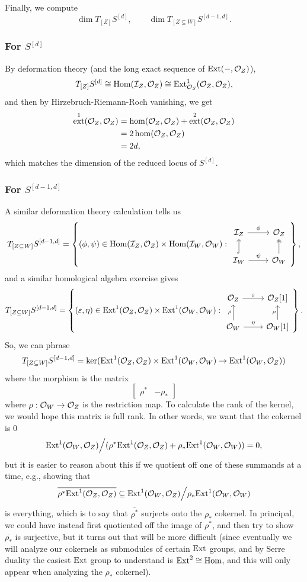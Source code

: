 \documentclass[12pt]{article}
\DeclareMathOperator{\ext}{ext}
\begin{document}
Finally, we compute
\[\dim T_{[Z]} S^{[d]}, \qquad \dim T_{[Z\subseteq W]} S^{[d-1,d]}.\]

\subsubsection*{For \texorpdfstring{$S^{[d]}$}.}
By deformation theory (and the long exact sequence of $\mathrm{Ext}(-,\mathcal{O}_Z)$),
\[T_{[Z]} S^{[d]} \cong \mathrm{Hom}(\mathcal{I}_Z, \mathcal{O}_Z) \cong \mathrm{Ext}^1_{\mathcal{O}_S}(\mathcal{O}_Z,\mathcal{O}_Z),\]
and then by Hirzebruch-Riemann-Roch vanishing, we get
\begin{align*}
    \ext^1(\cO_Z,\cO_Z) &= \hom(\cO_Z,\cO_Z) + \ext^2(\cO_Z,\cO_Z)\\
    &= 2\hom(\cO_Z, \cO_Z)\\
    &= 2d,
\end{align*}
which matches the dimension of the reduced locus of $S^{[d]}$.


\subsubsection*{For \texorpdfstring{$S^{[d-1,d]}$}.}

A similar deformation theory calculation tells us
\[T_{[Z\subseteq W]} S^{[d-1,d]} = \left\{(\phi,\psi) \in \Hom(\cI_Z,\cO_Z) \times \Hom(\cI_W,\cO_W): \begin{tikzcd}
    \cI_Z \rar["\phi"] & \cO_Z\\
    \cI_W \uar[hook] \rar["\psi"] & \cO_W \uar[two heads]
\end{tikzcd} \right\},\]
and a similar homological algebra exercise gives
\[T_{[Z\subseteq W]} S^{[d-1,d]} = \left\{(\eps,\eta) \in \Ext^1(\cO_Z,\cO_Z) \times \Ext^1(\cO_W,\cO_W): \begin{tikzcd}
    \cO_Z \rar["\eps"] & \cO_Z[1]\\
    \cO_W \uar["\rho"] \rar["\eta"] & \cO_W[1] \uar["\rho"]
\end{tikzcd} \right\}.\]
So, we can phrase
\[T_{[Z\subseteq W]} S^{[d-1,d]} = \ker(\mathrm{Ext}^1(\mathcal{O}_Z,\mathcal{O}_Z)\times \mathrm{Ext}^1(\mathcal{O}_W,\mathcal{O}_W) \to \mathrm{Ext}^1(\mathcal{O}_W,\mathcal{O}_Z))\]
where the morphism is the matrix
\[\begin{bmatrix}
    \rho^* & -\rho_*
\end{bmatrix}\]
where $\rho: \mathcal{O}_W \to \mathcal{O}_Z$ is the restriction map. To calculate the rank of the kernel, we would hope this matrix is full rank. In other words, we want that the cokernel is 0
\[\mathrm{Ext}^1(\mathcal{O}_W,\mathcal{O}_Z) \Big/ (\rho^* \mathrm{Ext}^1(\mathcal{O}_Z,\mathcal{O}_Z) + \rho_*\mathrm{Ext}^1(\mathcal{O}_W,\mathcal{O}_W)) = 0,\]
but it is easier to reason about this if we quotient off one of these summands at a time, e.g., showing that
\[\overline{\rho^*\mathrm{Ext}^1(\mathcal{O}_Z,\mathcal{O}_Z)} \subseteq \mathrm{Ext}^1(\mathcal{O}_W,\mathcal{O}_Z) \Big/ \rho_*\mathrm{Ext}^1(\mathcal{O}_W,\mathcal{O}_W)\]
is everything, which is to say that $\overline{\rho^*}$ surjects onto the $\rho_*$ cokernel. In principal, we could have instead first quotiented off the image of $\rho^*$, and then try to show $\overline{\rho_*}$ is surjective, but it turns out that will be more difficult (since eventually we will analyze our cokernels as submodules of certain $\mathrm{Ext}$ groups, and by Serre duality the easiest $\mathrm{Ext}$ group to understand is $\mathrm{Ext}^2\cong \mathrm{Hom}$, and this will only appear when analyzing the $\rho_*$ cokernel).
\end{document}
